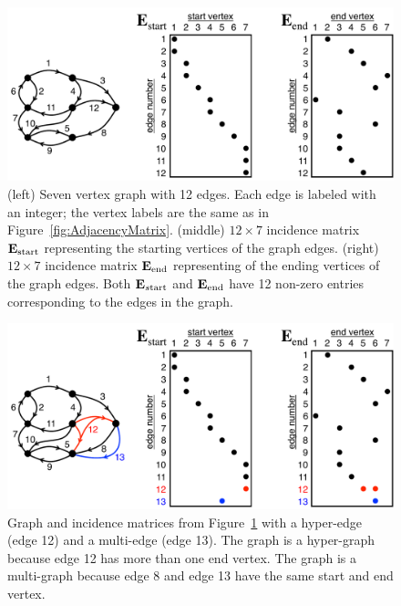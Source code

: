 \begin{figure}[!htb]
  \centering
    \includegraphics[width=4.5in]{figures/IncidenceMatrix.pdf}
      \caption{(left) Seven vertex graph with 12 edges.  Each edge is labeled with an integer; the vertex labels are the same as in Figure~\ref{fig:AdjacencyMatrix}.  (middle)  $12 \times 7$ incidence matrix $\mathbf{E}_{\rm start}$ representing the starting vertices of the graph edges.   (right)  $12 \times 7$ incidence matrix $\mathbf{E}_{\rm end}$ representing of the ending vertices of the graph edges. Both $\mathbf{E}_{s\rm tart}$ and $\mathbf{E}_{\rm end}$ have 12 non-zero entries corresponding to the edges in the graph.}
      \label{fig:IncidenceMatrix}
\end{figure}
\begin{figure}[!htb]
  \centering
    \includegraphics[width=4.5in]{figures/IncidenceMatrixMultiHyper.pdf}
      \caption{Graph and incidence matrices from Figure~\ref{fig:IncidenceMatrix} with a hyper-edge (edge 12) and a multi-edge (edge 13).  The graph is a hyper-graph because edge 12 has more than one end vertex.  The graph is a multi-graph because edge 8 and edge 13 have the same start and end vertex.}
      \label{fig:IncidenceMatrixMultiHyper}
\end{figure}

